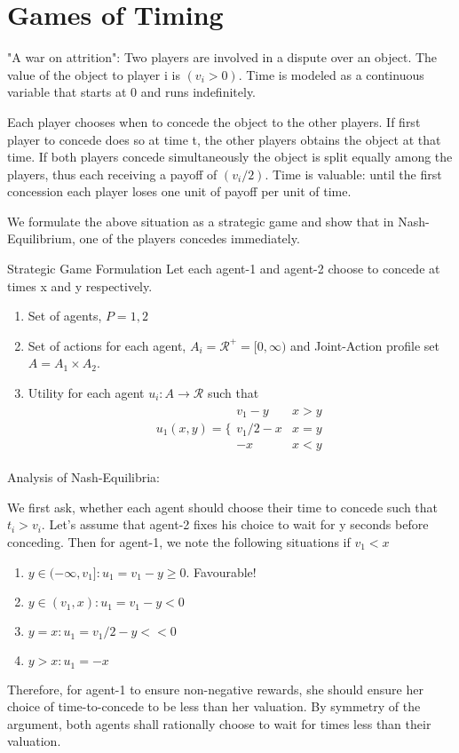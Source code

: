 \documentclass[11pt]{article}
\theoremstyle{definition}
\begin{document}
\section{Games of Timing}
"A war on attrition": 
Two players are involved in a dispute over an object. The value of the object to player i is $(v_i>0)$. Time is modeled as a continuous variable that starts at 0 and runs indefinitely. 

Each player chooses when to concede the object to the other players. If first player to concede does so at time t, the other players obtains the object at that time. If both players concede simultaneously the object is split equally among the players, thus each receiving a payoff of $(v_i/2)$. Time is valuable: until the first concession each player loses one unit of payoff per unit of time.

We formulate the above situation as a strategic game and show that in Nash-Equilibrium, one of the players concedes immediately.

Strategic Game Formulation
Let each agent-1 and agent-2 choose to concede at times x and y respectively. 
\begin{enumerate}
\item Set of agents, $P = {1,2}$
\item Set of actions for each agent, $A_i = \mathcal{R}^{+} = [0,\infty)$ and Joint-Action profile set $A = A_1 \times A_2$.
\item Utility for each agent $u_i: A \rightarrow \mathcal{R}$ such that
\begin{align}
u_1(x,y) = \bigg\{ \begin{array}{cc}
v_1 - y & x>y\\
v_1/2 - x & x= y\\
-x & x<y
\end{array}
\end{align}
\end{enumerate}

Analysis of Nash-Equilibria:

We first ask, whether each agent should choose their time to concede such that $t_i > v_i$.  Let's assume that agent-2 fixes his choice to wait for y seconds before conceding. Then for agent-1, we note the following situations if $v_1 < x$
\begin{enumerate}
\item $y \in (-\infty,v_1] \colon u_1 = v_1 - y \geq 0$. Favourable!
\item $y\in (v_1,x)\colon u_1 = v_1 - y < 0$
\item $y = x \colon u_1 = v_1/2 - y << 0$
\item $y>x \colon u_1 = -x$
\end{enumerate}
Therefore, for agent-1 to ensure non-negative rewards, she should ensure her choice of time-to-concede to be less than her valuation. By symmetry of the argument, both agents shall rationally choose to wait for times less than their valuation. 
\end{document}

